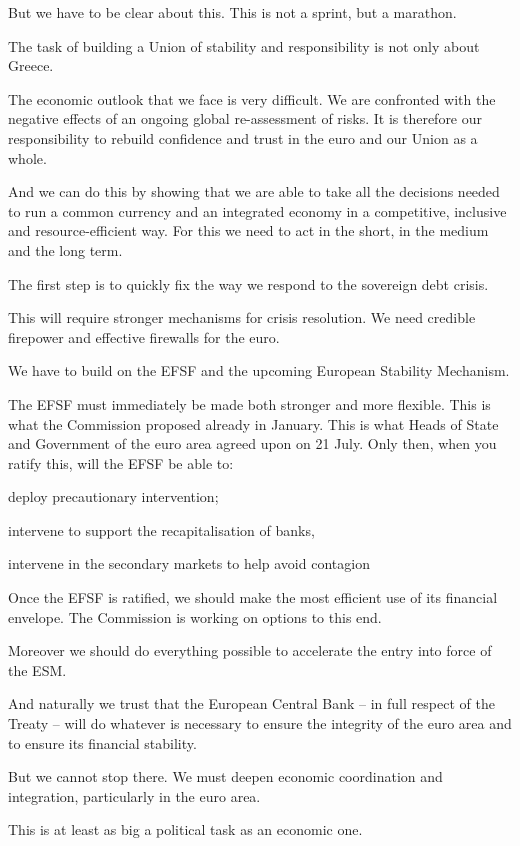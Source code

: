 \documentclass[a4paper,11pt]{article}
\begin{document}
But we have to be clear about this. This is not a sprint, but a marathon.

The task of building a Union of stability and responsibility is not only about Greece.

The economic outlook that we face is very difficult. We are confronted with the negative effects of an ongoing global re-assessment of risks. It is therefore our responsibility to rebuild confidence and trust in the euro and our Union as a whole.

And we can do this by showing that we are able to take all the decisions needed to run a common currency and an integrated economy in a competitive, inclusive and resource-efficient way. For this we need to act in the short, in the medium and the long term.

The first step is to quickly fix the way we respond to the sovereign debt crisis.

This will require stronger mechanisms for crisis resolution. We need credible firepower and effective firewalls for the euro.

We have to build on the EFSF and the upcoming European Stability Mechanism.

The EFSF must immediately be made both stronger and more flexible. This is what the Commission proposed already in January. This is what Heads of State and Government of the euro area agreed upon on 21 July. Only then, when you ratify this, will the EFSF be able to:

    deploy precautionary intervention;

    intervene to support the recapitalisation of banks,

    intervene in the secondary markets to help avoid contagion 

Once the EFSF is ratified, we should make the most efficient use of its financial envelope. The Commission is working on options to this end.

Moreover we should do everything possible to accelerate the entry into force of the ESM.

And naturally we trust that the European Central Bank – in full respect of the Treaty – will do whatever is necessary to ensure the integrity of the euro area and to ensure its financial stability.

But we cannot stop there. We must deepen economic coordination and integration, particularly in the euro area.

This is at least as big a political task as an economic one.
\end{document}
